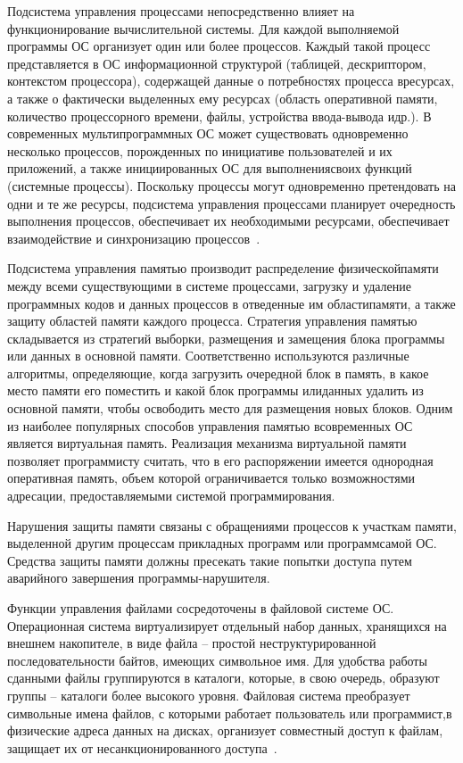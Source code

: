 Подсистема   управления   процессами   непосредственно   влияет   на функционирование   вычислительной   системы.   Для   каждой   выполняемой программы ОС организует один или более процессов. Каждый такой процесс представляется в ОС информационной структурой (таблицей, дескриптором, контекстом процессора),   содержащей   данные   о   потребностях   процесса   вресурсах, а также о фактически выделенных ему ресурсах (область оперативной памяти, количество процессорного времени, файлы, устройства ввода-вывода идр.).   В   современных   мультипрограммных   ОС   может   существовать одновременно   несколько   процессов,   порожденных   по   инициативе пользователей и их приложений, а также инициированных ОС для выполнениясвоих   функций   (системные   процессы).   Поскольку   процессы   могут одновременно претендовать на одни и те же ресурсы, подсистема управления процессами планирует очередность выполнения процессов, обеспечивает их необходимыми   ресурсами,   обеспечивает   взаимодействие   и   синхронизацию процессов~\cite{Oc2}.

Подсистема управления памятью производит распределение физическойпамяти   между   всеми   существующими   в   системе   процессами,   загрузку   и удаление программных кодов и данных процессов в отведенные им областипамяти,   а   также   защиту   областей   памяти   каждого   процесса.   Стратегия управления   памятью   складывается   из   стратегий   выборки,   размещения   и замещения блока программы или данных в основной памяти. Соответственно используются различные алгоритмы, определяющие, когда загрузить очередной блок в память, в какое место памяти его поместить и какой блок программы илиданных удалить из основной памяти, чтобы освободить место для размещения новых блоков. Одним из наиболее популярных способов управления памятью всовременных   ОС   является   виртуальная   память.   Реализация   механизма виртуальной памяти позволяет программисту считать, что в его распоряжении имеется однородная оперативная память, объем которой ограничивается только возможностями адресации, предоставляемыми системой программирования.

Нарушения защиты памяти связаны с обращениями процессов к участкам памяти, выделенной другим процессам прикладных программ или программсамой ОС. Средства защиты памяти должны пресекать такие попытки доступа путем аварийного завершения программы-нарушителя.

Функции управления файлами сосредоточены в файловой системе ОС. Операционная система виртуализирует отдельный набор данных, хранящихся на   внешнем   накопителе,   в   виде   файла   –   простой   неструктурированной последовательности байтов, имеющих символьное имя. Для удобства работы сданными файлы группируются в каталоги, которые, в свою очередь, образуют группы – каталоги более высокого уровня. Файловая система преобразует символьные имена файлов, с которыми работает пользователь или программист,в физические адреса данных на дисках, организует совместный доступ к файлам, защищает их от несанкционированного доступа~\cite{Oc2}.

